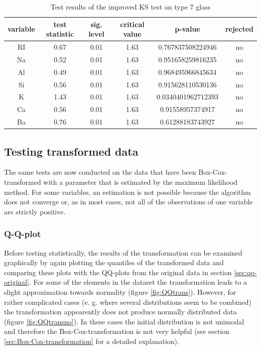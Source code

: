 \documentclass[a4paper, 12pt, titlepage, headsepline, listof = totoc, bibliography = totoc, numbers = noenddot]{scrartcl}
\begin{document}
\begin{table}[h!]
\centering
\begin{tabular}{|cccccc|} \hline variable & test statistic & sig. level & critical value & p-value & rejected\\ \hline RI & 0.67 & 0.01 & 1.63 & 0.767837508224946 & no\\ 
Na & 0.52 & 0.01 & 1.63 & 0.951658259816235 & no\\ 
Al & 0.49 & 0.01 & 1.63 & 0.968495966845634 & no\\ 
Si & 0.56 & 0.01 & 1.63 & 0.915628110530136 & no\\ 
K & 1.43 & 0.01 & 1.63 & 0.0340401962712393 & no\\ 
Ca & 0.56 & 0.01 & 1.63 & 0.91558957374917 & no\\ 
Ba & 0.76 & 0.01 & 1.63 & 0.61288183743927 & no\\ \hline \end{tabular}\caption{Test results of the improved KS test on type 7 glass}
\label{tab:KS-type7}
\end{table}

\subsection{Testing transformed data}\label{sec:testing-transformed-data}

The same tests are now conducted on the data that have been Box-Cox-transformed with a parameter that is estimated by the maximum likelihood method. For some variables, an estimation is not possible because the algorithm does not converge or, as in most cases, not all of the observations of one variable are strictly positive.
\subsubsection{Q-Q-plot}\label{sec:qq-transformed}

Before testing statistically, the results of the transformation can be examined graphically by again plotting the quantiles of the transformed data and comparing these plots with the QQ-plots from the original data in section \ref{sec:qq-original}. For some of the elements in the dataset the transformation leads to a slight approximation towards normality (figure \ref{fig:QQtrans}). However, for rather complicated cases (e. g. where several distributions seem to be combined) the transformation appearently does not produce normally distributed data (figure \ref{fig:QQtransno}). In these cases the initial distribution is not unimodal and therefore the Box-Cox-transformation is not very helpful (see section \ref{sec:Box-Cox-transformation} for a detailed explanation).
\end{document}
